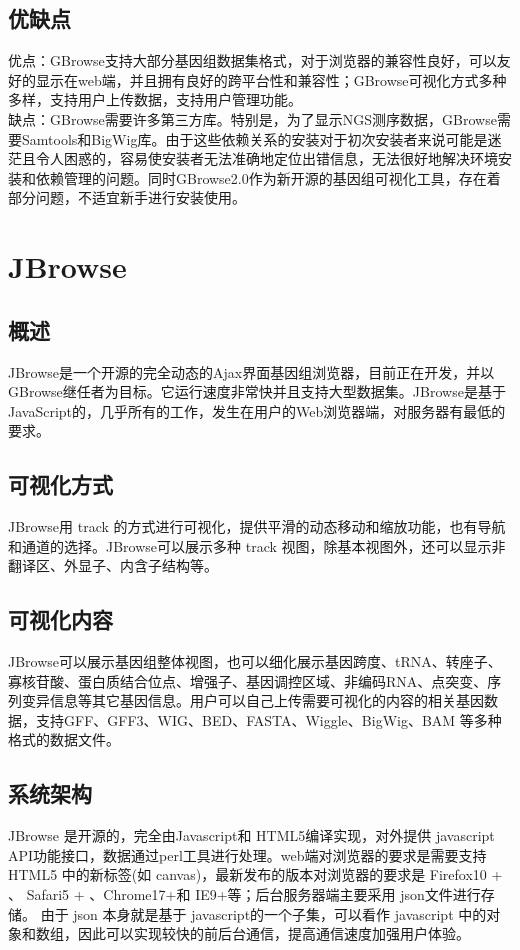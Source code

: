 		\subsection{优缺点}
		优点：GBrowse支持大部分基因组数据集格式，对于浏览器的兼容性良好，可以友好的显示在web端，并且拥有良好的跨平台性和兼容性；GBrowse可视化方式多种多样，支持用户上传数据，支持用户管理功能。\\
		\indent 缺点：GBrowse需要许多第三方库。特别是，为了显示NGS测序数据，GBrowse需要Samtools和BigWig库。由于这些依赖关系的安装对于初次安装者来说可能是迷茫且令人困惑的，容易使安装者无法准确地定位出错信息，无法很好地解决环境安装和依赖管理的问题。同时GBrowse2.0作为新开源的基因组可视化工具，存在着部分问题，不适宜新手进行安装使用。
	\section{JBrowse}
		\subsection{概述}
		JBrowse是一个开源的完全动态的Ajax界面基因组浏览器，目前正在开发，并以GBrowse继任者为目标。它运行速度非常快并且支持大型数据集。JBrowse是基于JavaScript的，几乎所有的工作，发生在用户的Web浏览器端，对服务器有最低的要求。 
		\subsection{可视化方式}
		JBrowse用 track 的方式进行可视化，提供平滑的动态移动和缩放功能，也有导航和通道的选择。JBrowse可以展示多种 track 视图，除基本视图外，还可以显示非翻译区、外显子、内含子结构等。
		
		\subsection{可视化内容}
		JBrowse可以展示基因组整体视图，也可以细化展示基因跨度、tRNA、转座子、寡核苷酸、蛋白质结合位点、增强子、基因调控区域、非编码RNA、点突变、序列变异信息等其它基因信息。用户可以自己上传需要可视化的内容的相关基因数据，支持GFF、GFF3、WIG、BED、FASTA、Wiggle、BigWig、BAM 等多种格式的数据文件。
		
		\subsection{系统架构}
		JBrowse 是开源的，完全由Javascript和 HTML5编译实现，对外提供 javascript API功能接口，数据通过perl工具进行处理。web端对浏览器的要求是需要支持 HTML5 中的新标签(如 canvas)，最新发布的版本对浏览器的要求是 Firefox10 + 、 Safari5 + 、Chrome17+和 IE9+等；后台服务器端主要采用 json文件进行存储。 由于 json 本身就是基于 javascript的一个子集，可以看作 javascript 中的对象和数组，因此可以实现较快的前后台通信，提高通信速度加强用户体验。
